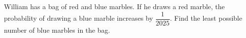 William has a bag of red and blue marbles. If he draws a red marble, the probability of drawing a blue marble increases by $\dfrac{1}{2025}$. Find the least possible number of blue marbles in the bag.
